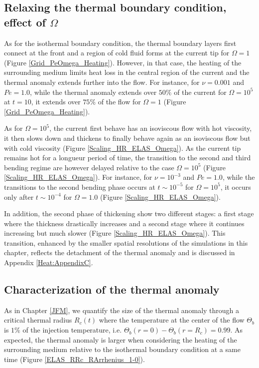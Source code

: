 \subsection{Relaxing  the   thermal  boundary  condition,   effect  of
  $\Omega$}
\label{sec:infl-therm-bound}

As for the isothermal boundary  condition, the thermal boundary layers
first connect  at the front  and a region of  cold fluid forms  at the
current  tip for  $\Omega  =  1$ (Figure  \ref{Grid_PeOmega_Heating}).
However, in  that case, the  heating of the surrounding  medium limits
heat loss in the central region of the current and the thermal anomaly
extends  further into  the flow.   For instance,  for $\nu=0.001$  and
$Pe=1.0$, while the thermal anomaly extends over $50\%$ of the current
for $\Omega = 10^5$ at $t=10$, it  extends over $75\%$ of the flow for
$\Omega=1$ (Figure \ref{Grid_PeOmega_Heating}).

As for $\Omega=10^5$, the current  first behave has an isoviscous flow
with hot viscosity, it then slows  down and thickens to finally behave
again  as  an   isoviscous  flow  but  with   cold  viscosity  (Figure
\ref{Scaling_HR_ELAS_Omega}).  As  the current  tip remains hot  for a
longueur  period of  time,  the  transition to  the  second and  third
bending regime are however delayed relative to the case $\Omega= 10^5$
(Figure \ref{Scaling_HR_ELAS_Omega}).  For instance, for $\nu=10^{-3}$
and $Pe=1.0$, while the transitions to the second bending phase occurs
at  $t\sim   10^{-5}$  for  $\Omega=10^{5}$,  it   occurs  only  after
$t\sim       10^{-4}$       for      $\Omega=       1.0$       (Figure
\ref{Scaling_HR_ELAS_Omega}).

In addition, the second phase of thickening show two different stages:
a first stage  where the thickness drastically increases  and a second
stage  where   it  continues   increasing  but  much   slower  (Figure
\ref{Scaling_HR_ELAS_Omega}). This transition, enhanced by the smaller
spatial resolutions of  the simulations in this  chapter, reflects the
detachment  of  the  thermal  anomaly and  is  discussed  in  Appendix
\ref{Heat:AppendixC}.

\subsection{Characterization of the thermal anomaly}
\label{sec:char-therm-anom}

As in Chapter  \ref{JFM}, we quantify the size of  the thermal anomaly
through a  critical thermal radius  $R_c(t)$ where the  temperature at
the  center  of  the  flow   $\Theta_b$  is  $1\%$  of  the  injection
temperature, i.e.  $\Theta_b(r=0)-\Theta_b(r=R_c)=0.99$.  As expected,
the  thermal anomaly  is larger  when considering  the heating  of the
surrounding medium relative to the  isothermal boundary condition at a
same time (Figure \ref{ELAS_RRc_RArrhenius_1-0}).

